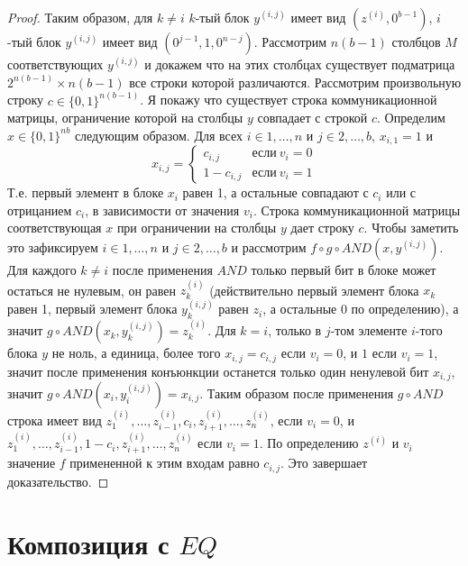 \documentclass{article}
\begin{document}
\begin{theorem}
\begin{proof}
    Таким образом, для $k \neq i$ $k$-тый блок $y^{(i, j)}$ имеет вид $(z^{(i)}, 0^{b - 1})$, $i$-тый блок $y^{(i, j)}$ имеет вид $(0^{j - 1}, 1, 0^{n - j})$. Рассмотрим $n(b - 1)$ столбцов $M$ соответствующих $y^{(i, j)}$ и докажем что на этих столбцах существует подматрица $2^{n(b - 1)} \times n(b - 1)$ все строки которой различаются. Рассмотрим произвольную строку $c \in \{0, 1\}^{n(b - 1)}$. Я покажу что существует строка коммуникационной матрицы, ограничение которой на столбцы $y$ совпадает с строкой $c$. Определим $x \in \{0, 1\}^{nb}$ следующим образом. Для всех $i \in 1, \ldots, n$ и $j \in 2, \ldots, b$, $x_{i,1} = 1$ и $$x_{i, j} = \begin{cases}c_{i, j}&\textit{если}\ v_i = 0\\1 - c_{i, j} &\textit{если}\ v_i = 1\end{cases}$$ Т.е. первый элемент в блоке $x_{i}$ равен 1, а остальные совпадают с $c_i$ или с отрицанием $c_i$, в зависимости от значения $v_i$. Строка коммуникационной матрицы соответствующая $x$ при ограничении на столбцы $y$ дает строку $c$. Чтобы заметить это зафиксируем $i \in 1, \ldots, n$ и $j \in 2, \ldots, b$ и рассмотрим $f \circ g \circ AND(x, y^{(i, j)})$. Для каждого $k \neq i$ после применения $AND$ только первый бит в блоке может остаться не нулевым, он равен $z^{(i)}_{k}$ (действительно первый элемент блока $x_k$ равен 1, первый элемент блока $y^{(i, j)}_k$ равен $z_i$, а остальные 0 по определению), а значит $g \circ AND(x_{k}, y^{(i, j)}_{k}) = z^{(i)}_{k}$. Для $k = i$, только в $j$-том элементе $i$-того блока $y$ не ноль, а единица, более того $x_{i, j} = c_{i, j}$ если $v_i = 0$, и $1$ если $v_i = 1$, значит после применения конъюнкции останется только один ненулевой бит $x_{i, j}$, значит $g \circ AND(x_{i}, y^{(i, j)}_{i}) = x_{i, j}$. Таким образом после применения $g \circ AND$ строка имеет вид $z_1^{(i)}, \ldots, z_{i-1}^{(i)}, c_i, z_{i+1}^{(i)}, \ldots, z_{n}^{(i)}$, если $v_i = 0$, и $z_1^{(i)}, \ldots, z_{i-1}^{(i)}, 1 - c_i, z_{i+1}^{(i)}, \ldots, z_{n}^{(i)}$ если $v_i = 1$. По определению $z^{(i)}$ и $v_{i}$ значение $f$ примененной к этим входам равно $c_{i, j}$. Это завершает доказательство.
    \end{proof}
\end{theorem} 

\section{Композиция с $EQ$}
\label{sec:eq}
\end{document}
